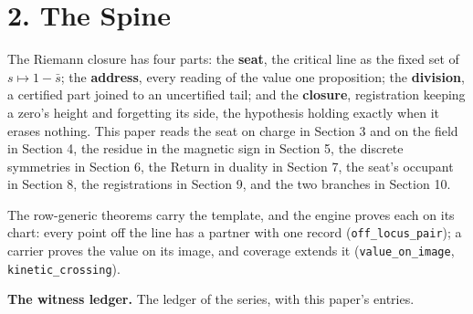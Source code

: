 \documentclass[10pt]{article}
\begin{document}
\hypertarget{the-spine}{%
\section{2. The Spine}\label{the-spine}}

The Riemann closure has four parts: the \textbf{seat}, the critical line
as the fixed set of \(s\mapsto1-\bar s\); the \textbf{address}, every
reading of the value one proposition; the \textbf{division}, a certified
part joined to an uncertified tail; and the \textbf{closure},
registration keeping a zero's height and forgetting its side, the
hypothesis holding exactly when it erases nothing. This paper reads the
seat on charge in Section 3 and on the field in Section 4, the residue
in the magnetic sign in Section 5, the discrete symmetries in Section 6,
the Return in duality in Section 7, the seat's occupant in Section 8,
the registrations in Section 9, and the two branches in Section 10.

The row-generic theorems carry the template, and the engine proves each
on its chart: every point off the line has a partner with one record
(\texttt{off\_locus\_pair}); a carrier proves the value on its image,
and coverage extends it (\texttt{value\_on\_image},
\texttt{kinetic\_crossing}).

\textbf{The witness ledger.} The ledger of the series, with this paper's
entries.

\begingroup\scriptsize
\end{document}
